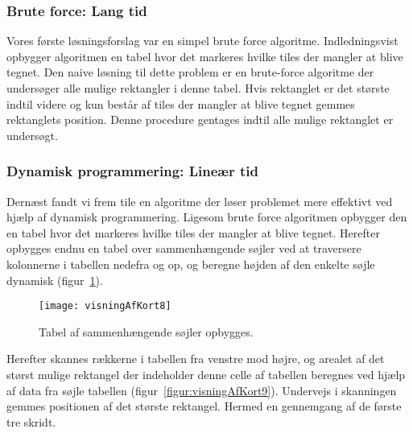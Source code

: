 \subsubsection{Brute force: Lang tid}
\label{subsec:bruteForce}

Vores første løsningsforslag var en simpel brute force algoritme. Indledningsvist opbygger algoritmen en tabel hvor det markeres hvilke tiles der mangler at blive tegnet. Den naive løsning til dette problem er en brute-force algoritme der undersøger alle mulige rektangler i denne tabel. Hvis rektanglet er det største indtil videre og kun består af tiles der mangler at blive tegnet gemmes rektanglets position. Denne procedure gentages indtil alle mulige rektanglet er undersøgt.

\subsubsection{Dynamisk programmering: Lineær tid}
\label{subsec:dynamiskProgrammering}

Dernæst fandt vi frem tile en algoritme der løser problemet mere effektivt ved hjælp af dynamisk programmering. Ligesom brute force algoritmen opbygger den en tabel hvor det markeres hvilke tiles der mangler at blive tegnet. Herefter opbygges endnu en tabel over sammenhængende søjler ved at traversere kolonnerne i tabellen nedefra og op, og beregne højden af den enkelte søjle dynamisk (figur~\ref{figur:visningAfKort8}).

\begin{figure}[h]
	\centering
	\texttt{[image: visningAfKort8]}
	\captionsetup{width=0.8\textwidth}
	\caption{Tabel af sammenhængende søjler opbygges.}
	\label{figur:visningAfKort8}
\end{figure}

Herefter skannes rækkerne i tabellen fra venstre mod højre, og arealet af det størst mulige rektangel der indeholder denne celle af tabellen beregnes ved hjælp af data fra søjle tabellen (figur~\ref{figur:visningAfKort9}). Undervejs i skanningen gemmes positionen af det største rektangel. Hermed en gennemgang af de første tre skridt.

